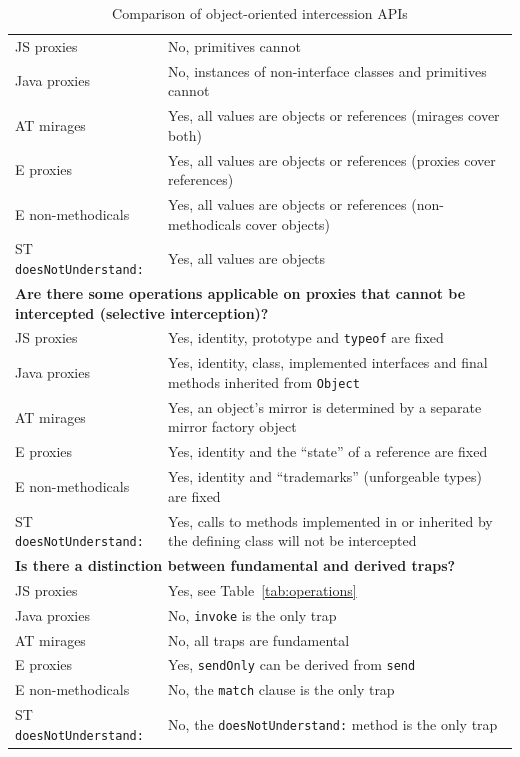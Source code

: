 \documentclass{sig-alternate}
\begin{document}
\begin{table}
\begin{tabular}{|p{}|p{}|}
    JS proxies        & No, primitives cannot\\
    Java proxies      & No, instances of non-interface classes and primitives cannot\\
    AT mirages        & Yes, all values are objects or references (mirages cover both)\\
    E proxies         & Yes, all values are objects or references (proxies cover references)\\
    E non-methodicals & Yes, all values are objects or references (non-methodicals cover objects)\\
    ST \texttt{doesNotUnderstand:}  & Yes, all values are objects\\
    \hline
    \multicolumn{2}{|l|}{\textbf{Are there some operations applicable on proxies that cannot be intercepted (selective interception)?}}\\
    \hline
    JS proxies        & Yes, identity, prototype and \texttt{typeof} are fixed\\
    Java proxies      & Yes, identity, class, implemented interfaces and final methods inherited from \texttt{Object}\\
    AT mirages        & Yes, an object's mirror is determined by a separate mirror factory object\\
    E proxies         & Yes, identity and the ``state'' of a reference are fixed\\
    E non-methodicals & Yes, identity and ``trademarks'' (unforgeable types) are fixed\\
    ST \texttt{doesNotUnderstand:}  & Yes, calls to methods implemented in or inherited by the defining class will not be intercepted\\
    \hline
    \multicolumn{2}{|l|}{\textbf{Is there a distinction between fundamental and derived traps?}}\\
    \hline
    JS proxies        & Yes, see Table~\ref{tab:operations}\\
    Java proxies      & No, \texttt{invoke} is the only trap\\
    AT mirages        & No, all traps are fundamental\\
    E proxies         & Yes, \texttt{sendOnly} can be derived from \texttt{send}\\
    E non-methodicals & No, the \texttt{match} clause is the only trap\\
    ST \texttt{doesNotUnderstand:}  & No, the \texttt{doesNotUnderstand:} method is the only trap\\
    \hline
  \end{tabular}
  \caption{Comparison of object-oriented intercession APIs}
  \label{tab:related_work}
\end{table}
\end{document}
